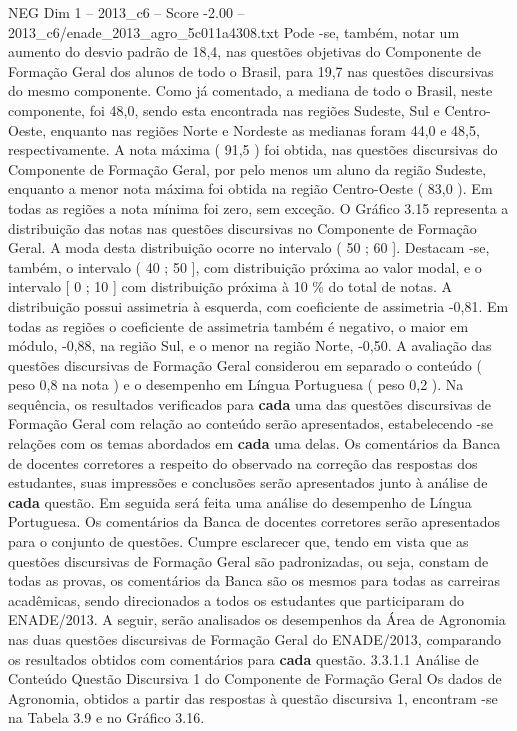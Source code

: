 \begin{textsample}{NEG Dim 1 – 2013\_c6 – Score -2.00 – 2013\_c6/enade\_2013\_agro\_5c011a4308.txt}
Pode -se, também, notar um aumento do desvio padrão de 18,4, nas questões objetivas do Componente de Formação Geral dos alunos de todo o Brasil, para 19,7 nas questões discursivas do mesmo componente.
Como já comentado, a mediana de todo o Brasil, neste componente, foi 48,0, sendo esta encontrada nas regiões Sudeste, Sul e Centro-Oeste, enquanto nas regiões Norte e Nordeste as medianas foram 44,0 e 48,5, respectivamente.
A nota máxima ( 91,5 ) foi obtida, nas questões discursivas do Componente de Formação Geral, por pelo menos um aluno da região Sudeste, enquanto a menor nota máxima foi obtida na região Centro-Oeste ( 83,0 ).
Em todas as regiões a nota mínima foi zero, sem exceção.
O Gráfico 3.15 representa a distribuição das notas nas questões discursivas no Componente de Formação Geral.
A moda desta distribuição ocorre no intervalo ( 50 ; 60 ].
Destacam -se, também, o intervalo ( 40 ; 50 ], com distribuição próxima ao valor modal, e o intervalo [ 0 ; 10 ] com distribuição próxima à 10 \% do total de notas.
A distribuição possui assimetria à esquerda, com coeficiente de assimetria -0,81.
Em todas as regiões o coeficiente de assimetria também é negativo, o maior em módulo, -0,88, na região Sul, e o menor na região Norte, -0,50.
A avaliação das questões discursivas de Formação Geral considerou em separado o conteúdo ( peso 0,8 na nota ) e o desempenho em Língua Portuguesa ( peso 0,2 ).
Na sequência, os resultados verificados para \textbf{cada} uma das questões discursivas de Formação Geral com relação ao conteúdo serão apresentados, estabelecendo -se relações com os temas abordados em \textbf{cada} uma delas.
Os comentários da Banca de docentes corretores a respeito do observado na correção das respostas dos estudantes, suas impressões e conclusões serão apresentados junto à análise de \textbf{cada} questão.
Em seguida será feita uma análise do desempenho de Língua Portuguesa.
Os comentários da Banca de docentes corretores serão apresentados para o conjunto de questões.
Cumpre esclarecer que, tendo em vista que as questões discursivas de Formação Geral são padronizadas, ou seja, constam de todas as provas, os comentários da Banca são os mesmos para todas as carreiras acadêmicas, sendo direcionados a todos os estudantes que participaram do ENADE/2013.
A seguir, serão analisados os desempenhos da Área de Agronomia nas duas questões discursivas de Formação Geral do ENADE/2013, comparando os resultados obtidos com comentários para \textbf{cada} questão. 3.3.1.1 Análise de Conteúdo Questão Discursiva 1 do Componente de Formação Geral Os dados de Agronomia, obtidos a partir das respostas à questão discursiva 1, encontram -se na Tabela 3.9 e no Gráfico 3.16.

\end{textsample}
